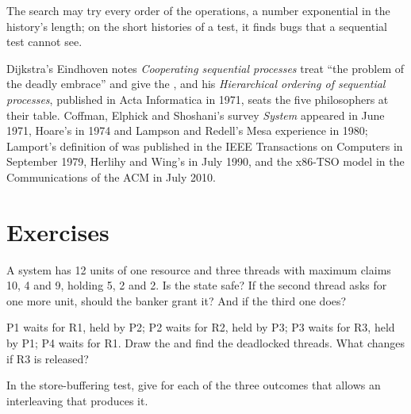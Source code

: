 The search may try every order of the operations, a number exponential in the history's length; on the short histories of a test, it finds bugs that a sequential test cannot see.

\begin{history}[Concurrency]
Dijkstra's Eindhoven notes \emph{Cooperating sequential processes} treat ``the problem of the deadly embrace'' and give the , %
and his \emph{Hierarchical ordering of sequential processes}, published in Acta Informatica in 1971, %
seats the five philosophers at their table. Coffman, Elphick and Shoshani's survey \emph{System } appeared in June 1971, %
Hoare's  in 1974 and Lampson and Redell's Mesa experience in 1980; Lamport's definition of  was published in the IEEE Transactions on Computers in September 1979, %
Herlihy and Wing's  in July 1990, %
and the x86-TSO model in the Communications of the ACM in July 2010. %
\end{history}

\section{Exercises}\label{sec:b3:concurrency:exercises}

\begin{exercise}[$\star$]\label{exo:b3:concurrency:1}
A system has 12 units of one resource and three threads with maximum claims 10, 4 and 9, holding 5, 2 and 2. Is the state safe? If the second thread asks for one more unit, should the banker grant it? And if the third one does?
\end{exercise}

\begin{exercise}[$\star$]\label{exo:b3:concurrency:2}
P1 waits for R1, held by P2; P2 waits for R2, held by P3; P3 waits for R3, held by P1; P4 waits for R1. Draw the  and find the deadlocked threads. What changes if R3 is released?
\end{exercise}

\begin{exercise}[$\star$]\label{exo:b3:concurrency:3}
In the store-buffering test, give for each of the three outcomes that  allows an interleaving that produces it.
\end{exercise}

